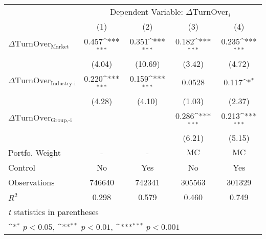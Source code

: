 {
\def\sym#1{\ifmmode^{#1}\else\(^{#1}\)\fi}
\begin{tabular}{l*{4}{c}}
\hline\hline
                    &\multicolumn{4}{c}{Dependent Variable: $\Delta \text{TurnOver}_{i} $ }                 \\\cmidrule(lr){2-5}
                    &\multicolumn{1}{c}{(1)}         &\multicolumn{1}{c}{(2)}         &\multicolumn{1}{c}{(3)}         &\multicolumn{1}{c}{(4)}         \\
\hline
 $ \Delta \text{TurnOver}_{\text{Market}} $ &       0.457\sym{***}&       0.351\sym{***}&       0.182\sym{***}&       0.235\sym{***}\\
                    &      (4.04)         &     (10.69)         &      (3.42)         &      (4.72)         \\
[1em]
 $ \Delta \text{TurnOver}_{\text{Industry-i}} $ &       0.220\sym{***}&       0.159\sym{***}&      0.0528         &       0.117\sym{*}  \\
                    &      (4.28)         &      (4.10)         &      (1.03)         &      (2.37)         \\
[1em]
 $ \Delta \text{TurnOver}_{\text{Group,-i}} $ &                     &                     &       0.286\sym{***}&       0.213\sym{***}\\
                    &                     &                     &      (6.21)         &      (5.15)         \\
\hline
Portfo. Weight      &           -         &           -         & $ \text{MC} $          & $ \text{MC} $          \\
Control             &          No         &         Yes         &          No         &         Yes         \\
Observations        &      746640         &      742341         &      305563         &      301329         \\
$ R^2 $             &       0.298         &       0.579         &       0.460         &       0.749         \\
\hline\hline
\multicolumn{5}{l}{\footnotesize \textit{t} statistics in parentheses}\\
\multicolumn{5}{l}{\footnotesize \sym{*} \(p<0.05\), \sym{**} \(p<0.01\), \sym{***} \(p<0.001\)}\\
\end{tabular}
}
